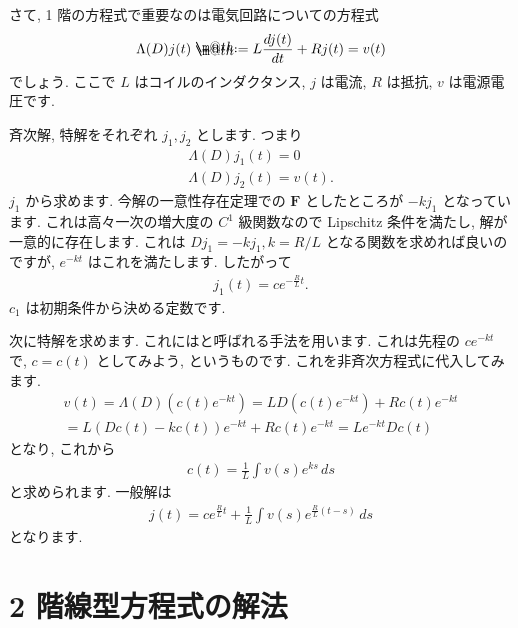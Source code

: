 \documentclass[openany, a4paper, oneside]{book}
\makeatletter
\newcommand*{\defeq}{\mathrel{\rlap{%
\raisebox{0.3ex}{$\m@th\cdot$}}%
\raisebox{-0.3ex}{$\m@th\cdot$}}%
=}
\theoremstyle{break}
\theoremstyle{breakdefn}
\makeatother
\begin{document}
さて, 1 階の方程式で重要なのは電気回路についての方程式
\begin{gather}
\Lambda (D) j (t)
\defeq
L \frac{d j (t)} {dt} + R j (t)
=
v (t)
\end{gather}
でしょう.
ここで $L$ はコイルのインダクタンス,  $j$ は電流,
$R$ は抵抗,  $v$ は電源電圧です.

斉次解, 特解をそれぞれ $j_1,j_2$ とします.
つまり
\begin{gather}
\Lambda (D) j_1 (t) = 0 \\
\Lambda (D) j_2 (t) = v (t) .
\end{gather}
$j_1$ から求めます.
今解の一意性存在定理での $\bm{F}$ としたところが $-k j_1$ となっています.
これは高々一次の増大度の $C^1$ 級関数なので Lipschitz 条件を満たし, 解が一意的に存在します.
これは $D j_1 = - k j_1,k=R/L$ となる関数を求めれば良いのですが,  $e^{-kt}$ はこれを満たします.
したがって
\begin{gather}
j_1 (t)
=
c e^{- \frac{R} {L} t } .
\end{gather}
$c_1$ は初期条件から決める定数です.

次に特解を求めます.
これにはと呼ばれる手法を用います.
これは先程の $ce^{-kt}$ で,  $c=c (t)$ としてみよう, というものです.
これを非斉次方程式に代入してみます.
\begin{gather}
v (t)
=
\Lambda (D) \left ( c (t) e^{-kt} \right)
=
L D \left ( c (t) e^{-kt} \right) + R c (t) e^{-kt} \\
=
L \left ( Dc (t) - k c (t) \right) e^{-kt}  + R c (t) e^{-kt}
=
L e^{-kt} D c (t)
\end{gather}
となり, これから
\begin{gather}
c (t)
=
\frac{1} {L} \int v (s) e^{ks} \, ds
\end{gather}
と求められます.
一般解は
\begin{gather}
j (t)
=
c e^{\frac{R} {L} t} + \frac{1} {L} \int v (s) e^{\frac{R} {L}(t-s)} \, ds
\end{gather}
となります.
\section{2 階線型方程式の解法}
\label{sec-5-2-14}
\end{document}
